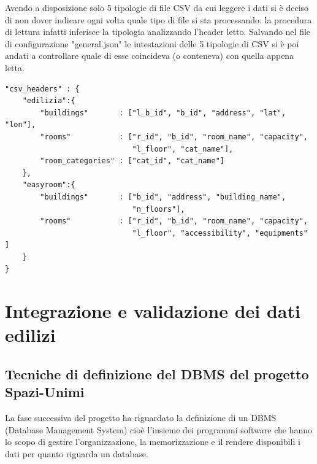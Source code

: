 \documentclass[12pt]{report}
\begin{document}
Avendo a disposizione solo 5 tipologie di file CSV da cui leggere i dati si è deciso di non dover indicare ogni volta quale tipo di file si sta processando: la procedura di lettura infatti inferisce la tipologia analizzando l'header letto.
Salvando nel file di configurazione "general.json" le intestazioni delle 5 tipologie di CSV si è poi andati a controllare quale di esse coincideva (o conteneva) con quella appena letta.
\begin{lstlisting}[label=codice,caption=Tipologie di header memorizzate in "'general.json'", frame=single]
"csv_headers" : {
    "edilizia":{
        "buildings"       : ["l_b_id", "b_id", "address", "lat", "lon"],
        "rooms"           : ["r_id", "b_id", "room_name", "capacity",
                             "l_floor", "cat_name"],
        "room_categories" : ["cat_id", "cat_name"]
    },
    "easyroom":{
        "buildings"       : ["b_id", "address", "building_name",
                             "n_floors"],
        "rooms"           : ["r_id", "b_id", "room_name", "capacity",
                             "l_floor", "accessibility", "equipments" ]
    }
}
\end{lstlisting}

\vspace{5mm} %


\chapter{Integrazione e validazione dei dati edilizi}
\label{cap2}

\section{Tecniche di definizione del DBMS del progetto Spazi-Unimi}

La fase successiva del progetto ha riguardato la definizione di un DBMS (Database Management System) cioè l'insieme dei programmi software che hanno lo scopo di gestire l'organizzazione, la memorizzazione e il rendere disponibili i dati per quanto riguarda un database.

\vspace{5mm} %
\end{document}
